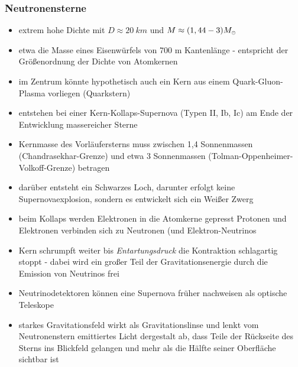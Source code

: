 \documentclass{beamer}
\begin{document}
\begin{frame}\frametitle{Neutronensterne}

\tiny

\begin{itemize}
\item extrem hohe Dichte mit $D \approx 20 \ km$ und $M \approx (1,44 - 3) M_{\tiny \astrosun}$
\item etwa die Masse eines Eisenwürfels von 700 m Kantenlänge - entspricht der Größenordnung der Dichte von Atomkernen
\item im Zentrum könnte hypothetisch auch ein Kern aus einem Quark-Gluon-Plasma vorliegen (Quarkstern)
\item entstehen bei einer Kern-Kollaps-Supernova (Typen II, Ib, Ic) am Ende der Entwicklung massereicher Sterne
\item Kernmasse des Vorläufersterns muss zwischen 1,4 Sonnenmassen (Chandrasekhar-Grenze) und etwa 3 Sonnenmassen (Tolman-Oppenheimer-Volkoff-Grenze) betragen
\item darüber entsteht ein Schwarzes Loch, darunter erfolgt keine Supernovaexplosion, sondern es entwickelt sich ein Weißer Zwerg \item beim Kollaps werden Elektronen in die Atomkerne gepresst Protonen und Elektronen verbinden sich zu Neutronen (und Elektron-Neutrinos
\item Kern schrumpft weiter bis \textit{Entartungsdruck} die Kontraktion schlagartig stoppt - dabei wird ein großer Teil der Gravitationsenergie durch die Emission von Neutrinos frei
\item Neutrinodetektoren können eine Supernova früher nachweisen als optische Teleskope
\item starkes Gravitationsfeld wirkt als Gravitationslinse und lenkt vom Neutronenstern emittiertes Licht dergestalt ab, dass Teile der Rückseite des Sterns ins Blickfeld gelangen und mehr als die Hälfte seiner Oberfläche sichtbar ist
\end{itemize}

\end{frame}
\end{document}
